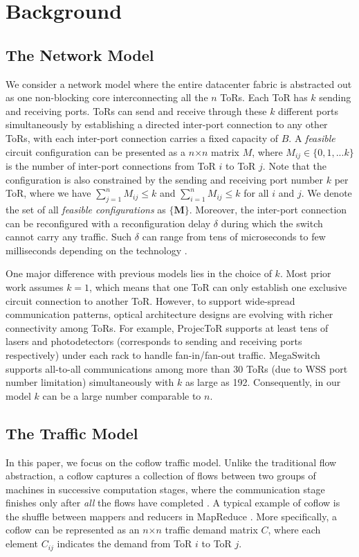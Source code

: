 \section{Background}

\subsection{The Network Model}
We consider a network model where the entire
datacenter fabric is abstracted out as one non-blocking core
 interconnecting all the $n$ ToRs.
Each ToR has $k$ sending and receiving ports. ToRs
can send and receive through these $k$ different ports simultaneously by establishing a directed inter-port connection to any other ToRs, with each inter-port connection carries a fixed capacity of $B$.
A \emph{feasible} circuit configuration can be presented as a $n$$\times$$n$ matrix $M$, where
$M_{ij} \in \{0,1, ...k\}$ is the number of inter-port connections from ToR $i$ to ToR $j$.
Note that the configuration is also constrained by the sending and receiving port number $k$ per ToR, where we have
 $\sum_{j=1}^nM_{ij}$$\leq$$k$ and $\sum_{i=1}^nM_{ij}$$\leq$$k$ for all $i$ and $j$. We denote the set of all \emph{feasible configurations} as $\{\mathbf{M}\}$. Moreover, the inter-port connection can be reconfigured with a reconfiguration delay $\delta$
during which the switch cannot carry any traffic. Such $\delta$ can range from tens
of microseconds to few milliseconds depending on the technology \cite{eclipse}.

One major difference with previous models lies in the choice of $k$. Most prior work assumes $k = 1$, which means that one ToR can only establish one exclusive circuit connection to another ToR.
However, to support wide-spread communication patterns, optical architecture designs are evolving with richer connectivity among ToRs. For example, ProjecToR \cite{projector} supports at least tens of lasers and photodetectors (corresponds to sending and receiving ports respectively) under each rack to handle fan-in/fan-out traffic. MegaSwitch \cite{megaswitch} supports all-to-all communications among more than 30 ToRs (due to WSS port number limitation) simultaneously with $k$ as large as 192. Consequently, in our model $k$ can be a large number comparable to $n$.

\subsection{The Traffic Model}
In this paper, we focus on the coflow traffic model.
Unlike the traditional flow abstraction, a coflow captures a collection of flows between two groups of machines in successive computation stages, where the communication stage finishes only after \emph{all} the flows have completed \cite{varys}. A typical example of coflow is the shuffle between mappers and reducers in MapReduce \cite{mapreduce}.
More specifically, a coflow can be represented as an
$n$$\times$$n$ traffic demand matrix $C$, where each element $C_{ij}$ indicates the demand from ToR $i$ to ToR $j$.
